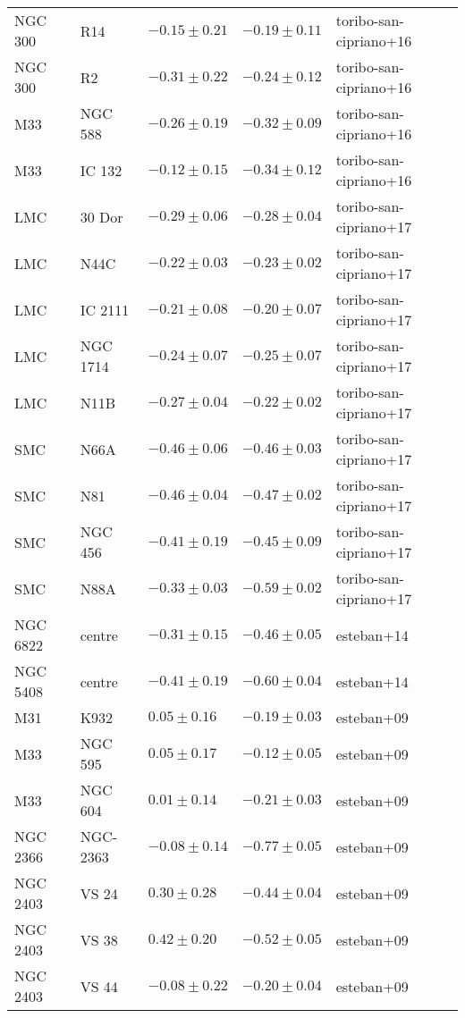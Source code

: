 \documentclass[11pt]{article}
\begin{document}
\begin{longtable}{lllll}
NGC 300 & R14 & $-0.15 \pm 0.21$ & $-0.19 \pm 0.11$ & toribo-san-cipriano+16 \\
NGC 300 & R2 & $-0.31 \pm 0.22$ & $-0.24 \pm 0.12$ & toribo-san-cipriano+16 \\
M33 & NGC 588 & $-0.26 \pm 0.19$ & $-0.32 \pm 0.09$ & toribo-san-cipriano+16 \\
M33 & IC 132 & $-0.12 \pm 0.15$ & $-0.34 \pm 0.12$ & toribo-san-cipriano+16 \\
LMC & 30 Dor & $-0.29 \pm 0.06$ & $-0.28 \pm 0.04$ & toribo-san-cipriano+17 \\
LMC & N44C & $-0.22 \pm 0.03$ & $-0.23 \pm 0.02$ & toribo-san-cipriano+17 \\
LMC & IC 2111 & $-0.21 \pm 0.08$ & $-0.20 \pm 0.07$ & toribo-san-cipriano+17 \\
LMC & NGC 1714 & $-0.24 \pm 0.07$ & $-0.25 \pm 0.07$ & toribo-san-cipriano+17 \\
LMC & N11B & $-0.27 \pm 0.04$ & $-0.22 \pm 0.02$ & toribo-san-cipriano+17 \\
SMC & N66A & $-0.46 \pm 0.06$ & $-0.46 \pm 0.03$ & toribo-san-cipriano+17 \\
SMC & N81 & $-0.46 \pm 0.04$ & $-0.47 \pm 0.02$ & toribo-san-cipriano+17 \\
SMC & NGC 456 & $-0.41 \pm 0.19$ & $-0.45 \pm 0.09$ & toribo-san-cipriano+17 \\
SMC & N88A & $-0.33 \pm 0.03$ & $-0.59 \pm 0.02$ & toribo-san-cipriano+17 \\
NGC 6822 & centre & $-0.31 \pm 0.15$ & $-0.46 \pm 0.05$ & esteban+14 \\
NGC 5408 & centre & $-0.41 \pm 0.19$ & $-0.60 \pm 0.04$ & esteban+14 \\
M31 & K932 & $0.05 \pm 0.16$ & $-0.19 \pm 0.03$ & esteban+09 \\
M33 & NGC 595 & $0.05 \pm 0.17$ & $-0.12 \pm 0.05$ & esteban+09 \\
M33 & NGC 604 & $0.01 \pm 0.14$ & $-0.21 \pm 0.03$ & esteban+09 \\
NGC 2366 & NGC-2363 & $-0.08 \pm 0.14$ & $-0.77 \pm 0.05$ & esteban+09 \\
NGC 2403 & VS 24 & $0.30 \pm 0.28$ & $-0.44 \pm 0.04$ & esteban+09 \\
NGC 2403 & VS 38 & $0.42 \pm 0.20$ & $-0.52 \pm 0.05$ & esteban+09 \\
NGC 2403 & VS 44 & $-0.08 \pm 0.22$ & $-0.20 \pm 0.04$ & esteban+09 \\
\hline
\end{longtable}
\end{document}
